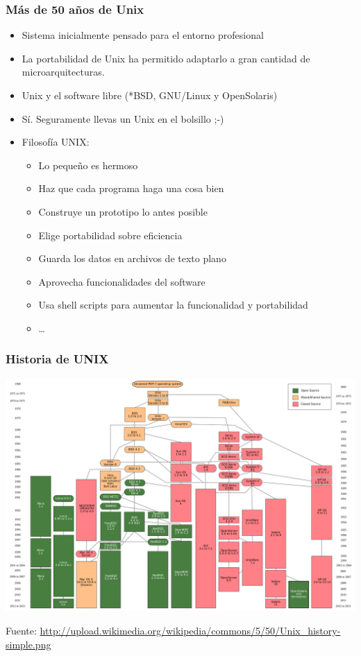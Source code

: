 \documentclass{beamer}
\begin{document}
\begin{frame}
  \frametitle{Más de 50 años de Unix}
  \begin{center}
    \begin{itemize}
    \item Sistema inicialmente pensado para el entorno profesional
    \item La portabilidad de Unix ha permitido adaptarlo a gran cantidad de
      microarquitecturas.
    \item Unix y el software libre (*BSD, GNU/Linux y OpenSolaris)
    \item Sí. Seguramente llevas un Unix en el bolsillo ;-)
    \item Filosofía UNIX:
      \begin{itemize}
      \item Lo pequeño es hermoso
      \item Haz que cada programa haga una cosa bien
      \item Construye un prototipo lo antes posible
      \item Elige portabilidad sobre eficiencia
      \item Guarda los datos en archivos de texto plano
      \item Aprovecha funcionalidades del software
      \item Usa shell scripts para aumentar la funcionalidad y portabilidad
      \item \ldots
      \end{itemize}
    \end{itemize}
  \end{center}
\end{frame}

\begin{frame} \frametitle{Historia de UNIX}
  \begin{center}
    \includegraphics[width=.85\textwidth]{Unix_history-simple.png}
\end{center}\tiny{Fuente: \url{http://upload.wikimedia.org/wikipedia/commons/5/50/Unix_history-simple.png}}
\end{frame}
\end{document}

